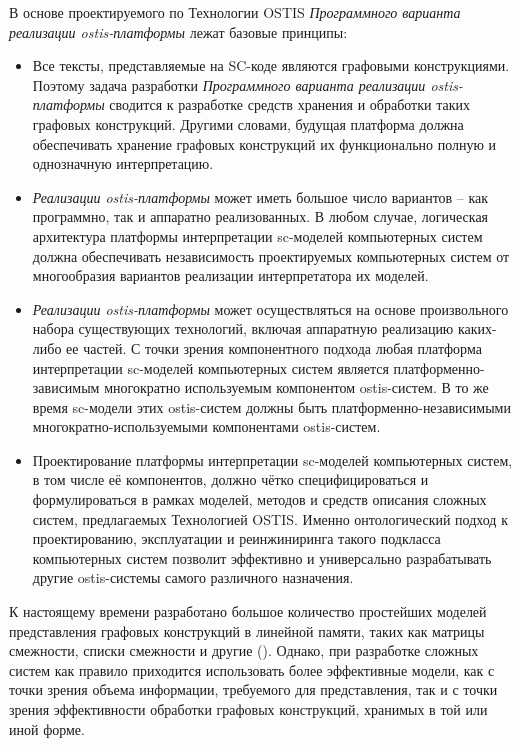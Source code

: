 В основе проектируемого по Технологии OSTIS \textit{Программного варианта реализации ostis-платформы} лежат
базовые принципы:

\begin{itemize}
    \item Все тексты, представляемые на SC-коде являются графовыми конструкциями. Поэтому задача разработки
    \textit{Программного варианта реализации ostis-платформы} сводится к разработке средств хранения и обработки таких
    графовых конструкций. Другими словами, будущая платформа должна обеспечивать хранение графовых конструкций их
    функционально полную и однозначную интерпретацию.
    \item \textit{Реализации ostis-платформы} может иметь большое число вариантов – как программно, так и аппаратно
    реализованных. В любом случае, логическая архитектура платформы интерпретации sc-моделей компьютерных систем должна
    обеспечивать независимость проектируемых компьютерных систем от многообразия вариантов реализации интерпретатора их
    моделей.
    \item \textit{Реализации ostis-платформы} может осуществляться на основе произвольного набора существующих технологий,
    включая аппаратную реализацию каких-либо ее частей. С точки зрения компонентного подхода любая платформа интерпретации
    sc-моделей компьютерных систем является платформенно-зависимым многократно используемым компонентом ostis-систем.
    В то же время sc-модели этих ostis-систем должны быть платформенно-независимыми многократно-используемыми компонентами
    ostis-систем.
    \item Проектирование платформы интерпретации sc-моделей компьютерных систем, в том числе её компонентов, должно
    чётко специфицироваться и формулироваться в рамках моделей, методов и средств описания сложных систем, предлагаемых
    Технологией OSTIS. Именно онтологический подход к проектированию, эксплуатации и реинжиниринга такого подкласса
    компьютерных систем позволит эффективно и универсально разрабатывать другие ostis-системы самого различного
    назначения.
\end{itemize}

К настоящему времени разработано большое количество простейших моделей представления графовых конструкций в линейной
памяти, таких как матрицы смежности, списки смежности и другие (). Однако, при разработке сложных
систем как правило приходится использовать более эффективные модели, как с точки зрения объема информации, требуемого
для представления, так и с точки зрения эффективности обработки графовых конструкций, хранимых в той или иной форме.

